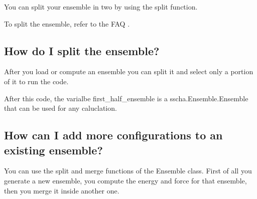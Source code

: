 \documentclass[a4paper,11pt,english]{sphinxmanual}
\begin{document}
\sphinxAtStartPar
You can split your ensemble in two by using the split function.

\sphinxAtStartPar
To split the ensemble, refer to the FAQ {\hyperref[\detokenize{faq:faq-split}]{}}.


\subsection{How do I split the ensemble?}
\label{\detokenize{faq:how-do-i-split-the-ensemble}}\label{\detokenize{faq:faq-split}}
\sphinxAtStartPar
After you load or compute an ensemble you can split it and select only a portion of it to run the code.

\begin{sphinxVerbatim}[commandchars=\\\{\}]

     
\PYG{p}{[}\PYG{p}{]}  

  
\end{sphinxVerbatim}

\sphinxAtStartPar
After this code, the varialbe first\_half\_ensemble is a sscha.Ensemble.Ensemble that
can be used for any caluclation.


\subsection{How can I add more configurations to an existing ensemble?}
\label{\detokenize{faq:how-can-i-add-more-configurations-to-an-existing-ensemble}}
\sphinxAtStartPar
You can use the split and merge functions of the Ensemble class.
First of all you generate a new ensemble, you compute the energy and force for that ensemble,
then you merge it inside another one.
\end{document}
